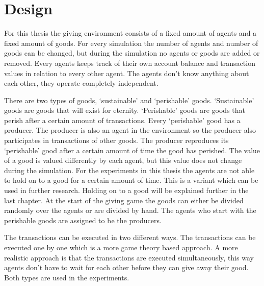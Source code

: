 \documentclass[twoside,openright]{uva-bachelor-thesis}
\begin{document}
\chapter{Design}
For this thesis the giving environment consists of a fixed amount of agents and a fixed amount of goods. For every simulation the number of agents and number of goods can be changed, but during the simulation no agents or goods are added or removed.  Every agents keeps track of their own account balance and transaction values in relation to every other agent. The agents don’t know anything about each other, they operate completely independent.

There are two types of goods, ‘sustainable’ and ‘perishable’ goods. ‘Sustainable’ goods are goods that will exist for eternity. ‘Perishable’ goods are goods that perish after a certain amount of transactions. Every ‘perishable’ good has a producer. The producer is also an agent in the environment so the producer also participates in transactions of other goods. The producer reproduces its ‘perishable’ good after a certain amount of time the good has perished. The value of a good is valued differently by each agent, but this value does not change during the simulation. For the experiments in this thesis the agents are not able to hold on to a good for a certain amount of time. This is a variant which can be used in further research. Holding on to a good will be explained further in the last chapter. At the start of the giving game the goods can either be divided randomly over the agents or are divided by hand. The agents who start with the perishable goods are assigned to be the producers.

The transactions can be executed in two different ways. The transactions can be executed one by one which is a more game theory based approach. A more realistic approach is that the transactions are executed simultaneously, this way agents don’t have to wait for each other before they can give away their good. Both types are used in the experiments.
\end{document}
